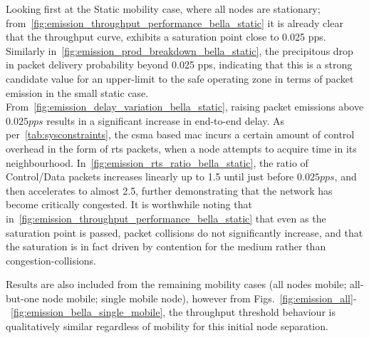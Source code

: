 Looking first at the Static mobility case, where all nodes are stationary; from~\autoref{fig:emission_throughput_performance_bella_static} it is already clear that the throughput curve, exhibits a saturation point close to 0.025 pps.
Similarly in~\autoref{fig:emission_prod_breakdown_bella_static}, the precipitous drop in packet delivery probability beyond 0.025 pps, indicating that this is a strong candidate value for an upper-limit to the safe operating zone in terms of packet emission in the small static case.
From~\autoref{fig:emission_delay_variation_bella_static}, raising packet emissions above $0.025pps$ results in a significant increase in end-to-end delay.
As per~\autoref{tab:sysconstraints}, the \gls{csma} based \gls{mac} incurs a certain amount of control overhead in the form of \gls{rts} packets, when a node attempts to acquire time in its neighbourhood.
In~\autoref{fig:emission_rts_ratio_bella_static}, the ratio of Control/Data packets increases linearly up to 1.5 until just before $0.025pps$, and then accelerates to almost 2.5, further demonstrating that the network has become critically congested.
It is worthwhile noting that in~\autoref{fig:emission_throughput_performance_bella_static} that even as the saturation point is passed, packet collisions do not significantly increase, and that the saturation is in fact driven by contention for the medium rather than congestion-collisions.

Results are also included from the remaining mobility cases (all nodes mobile; all-but-one node mobile; single mobile node), however from Figs.~\ref{fig:emission_all}-~\ref{fig:emission_bella_single_mobile}, the throughput threshold behaviour is qualitatively similar regardless of mobility for this initial node separation.

